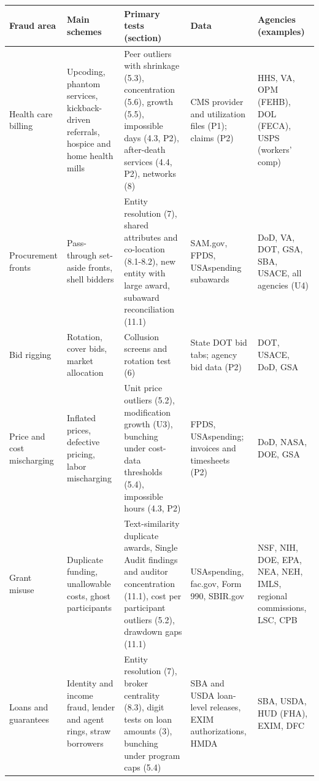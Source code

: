 \documentclass[letterpaper,11pt]{article}
\begin{document}
\begingroup\small\setlength{\tabcolsep}{4pt}\renewcommand{\arraystretch}{1.25}
\begin{longtable}[l]{@{}>{\raggedright\arraybackslash}p{}>{\raggedright\arraybackslash}p{}>{\raggedright\arraybackslash}p{}>{\raggedright\arraybackslash}p{}>{\raggedright\arraybackslash}p{}@{}}
\rowcolor{coolblack}\leavevmode\color{white}\bfseries Fraud area & \leavevmode\color{white}\bfseries Main schemes & \leavevmode\color{white}\bfseries Primary tests (section) & \leavevmode\color{white}\bfseries Data & \leavevmode\color{white}\bfseries Agencies (examples) \\
\endhead
Health care billing & Upcoding, phantom services, kickback-driven referrals, hospice and home health mills & Peer outliers with shrinkage (5.3), concentration (5.6), growth (5.5), impossible days (4.3, P2), after-death services (4.4, P2), networks (8) & CMS provider and utilization files (P1); claims (P2) & HHS, VA, OPM (FEHB), DOL (FECA), USPS (workers' comp) \\
Procurement fronts & Pass-through set-aside fronts, shell bidders & Entity resolution (7), shared attributes and co-location (8.1-8.2), new entity with large award, subaward reconciliation (11.1) & SAM.gov, FPDS, USAspending subawards & DoD, VA, DOT, GSA, SBA, USACE, all agencies (U4) \\
Bid rigging & Rotation, cover bids, market allocation & Collusion screens and rotation test (6) & State DOT bid tabs; agency bid data (P2) & DOT, USACE, DoD, GSA \\
Price and cost mischarging & Inflated prices, defective pricing, labor mischarging & Unit price outliers (5.2), modification growth (U3), bunching under cost-data thresholds (5.4), impossible hours (4.3, P2) & FPDS, USAspending; invoices and timesheets (P2) & DoD, NASA, DOE, GSA \\
Grant misuse & Duplicate funding, unallowable costs, ghost participants & Text-similarity duplicate awards, Single Audit findings and auditor concentration (11.1), cost per participant outliers (5.2), drawdown gaps (11.1) & USAspending, fac.gov, Form 990, SBIR.gov & NSF, NIH, DOE, EPA, NEA, NEH, IMLS, regional commissions, LSC, CPB \\
Loans and guarantees & Identity and income fraud, lender and agent rings, straw borrowers & Entity resolution (7), broker centrality (8.3), digit tests on loan amounts (3), bunching under program caps (5.4) & SBA and USDA loan-level releases, EXIM authorizations, HMDA & SBA, USDA, HUD (FHA), EXIM, DFC \\

\end{longtable}
\end{document}
